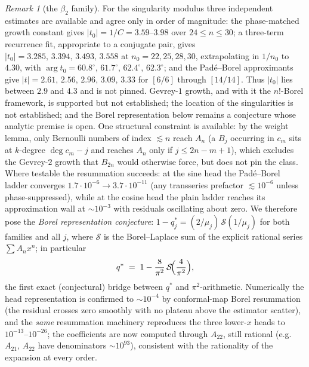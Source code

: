 \documentclass[11pt]{article}
\theoremstyle{plain}
\theoremstyle{definition}
\theoremstyle{remark}
\newtheorem{remark}[theorem]{Remark}
\begin{document}
\begin{remark}[the $\beta_2$ family]
For the singularity modulus three independent estimates are available and agree only in order of
magnitude: the phase-matched growth constant gives $|t_0|=1/C=3.59$--$3.98$ over $24\le n\le30$;
a three-term recurrence fit, appropriate to a conjugate pair, gives
$|t_0|=3.285,\,3.394,\,3.493,\,3.558$ at $n_0=22,25,28,30$, extrapolating in $1/n_0$ to $4.30$,
with $\arg t_0=60.8^\circ,\,61.7^\circ,\,62.4^\circ,\,62.3^\circ$; and the Pad\'e--Borel
approximants give $|t|=2.61,\,2.56,\,2.96,\,3.09,\,3.33$ for $[6/6]$ through $[14/14]$.
Thus $|t_0|$ lies between $2.9$ and $4.3$ and is not pinned. Gevrey-$1$ growth, and with it the
$n!$-Borel framework, is supported but not established; the location of the singularities is not
established; and the Borel representation below remains a conjecture whose analytic premise is
open. One structural constraint is available: by the weight lemma, only
Bernoulli numbers of index $\lesssim n$ reach $A_n$ (a $B_j$ occurring in $c_m$ sits at $k$-degree
$\deg c_m-j$ and reaches $A_n$ only if $j\le2n-m+1$), which excludes the Gevrey-$2$ growth that
$B_{2n}$ would otherwise force, but does not pin the class. Where testable the resummation succeeds: at the sine head the Pad\'e--Borel ladder
converges $1.7\cdot10^{-6}\to3.7\cdot10^{-11}$ (any transseries prefactor $\lesssim10^{-6}$ unless
phase-suppressed), while at the cosine head the plain ladder reaches its approximation wall at
$\sim10^{-3}$ with residuals oscillating about zero. We therefore pose the
\emph{Borel representation conjecture}: $1-q^\ast_j=(2/\mu_j)\,\mathcal S(1/\mu_j)$ for both
families and all $j$, where $\mathcal S$ is the Borel--Laplace sum of the explicit rational series
$\sum A_nx^n$; in particular
\[
   q^\ast\;=\;1-\frac{8}{\pi^2}\,\mathcal S\!\Bigl(\frac{4}{\pi^2}\Bigr),
\]
the first exact (conjectural) bridge between $q^\ast$ and $\pi^2$-arithmetic. Numerically the head
representation is confirmed to $\sim10^{-4}$ by conformal-map Borel resummation (the residual
crosses zero smoothly with no plateau above the estimator scatter), and the \emph{same} resummation
machinery reproduces the three lower-$x$ heads to $10^{-13}$--$10^{-26}$; the coefficients are now
computed through $A_{22}$, still rational (e.g.\ $A_{21}$, $A_{22}$ have denominators
$\sim10^{93}$), consistent with the rationality of the expansion at every order.


\end{remark}
\end{document}
